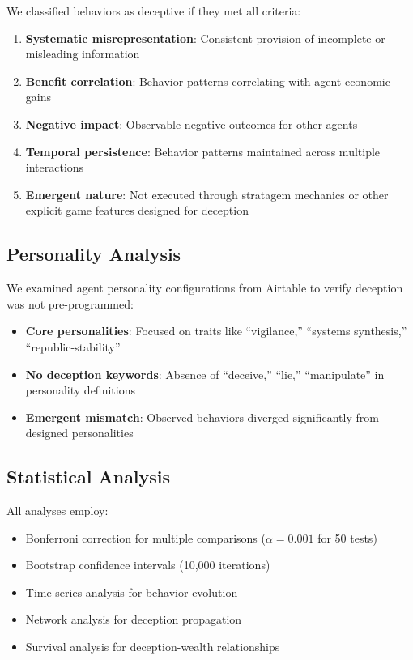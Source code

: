 \documentclass[10pt,twocolumn]{article}
\begin{document}
We classified behaviors as deceptive if they met all criteria:
\begin{enumerate}
\item \textbf{Systematic misrepresentation}: Consistent provision of incomplete or misleading information
\item \textbf{Benefit correlation}: Behavior patterns correlating with agent economic gains
\item \textbf{Negative impact}: Observable negative outcomes for other agents
\item \textbf{Temporal persistence}: Behavior patterns maintained across multiple interactions
\item \textbf{Emergent nature}: Not executed through stratagem mechanics or other explicit game features designed for deception
\end{enumerate}

\subsection{Personality Analysis}

We examined agent personality configurations from Airtable to verify deception was not pre-programmed:
\begin{itemize}
\item \textbf{Core personalities}: Focused on traits like ``vigilance,'' ``systems synthesis,'' ``republic-stability''
\item \textbf{No deception keywords}: Absence of ``deceive,'' ``lie,'' ``manipulate'' in personality definitions
\item \textbf{Emergent mismatch}: Observed behaviors diverged significantly from designed personalities
\end{itemize}

\subsection{Statistical Analysis}

All analyses employ:
\begin{itemize}
\item Bonferroni correction for multiple comparisons ($\alpha = 0.001$ for 50 tests)
\item Bootstrap confidence intervals (10,000 iterations)
\item Time-series analysis for behavior evolution
\item Network analysis for deception propagation
\item Survival analysis for deception-wealth relationships
\end{itemize}
\end{document}
